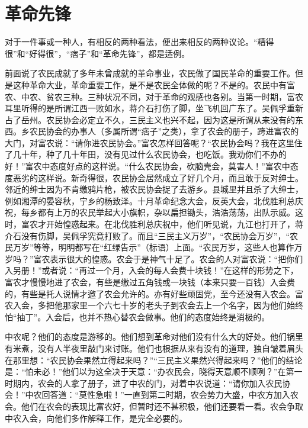 \section{革命先锋}

对于一件事或一种人，有相反的两种看法，便出来相反的两种议论。“糟得很”和“好得很”，“痞子”和“革命先锋”，都是适例。

前面说了农民成就了多年未曾成就的革命事业，农民做了国民革命的重要工作。但是这种革命大业，革命重要工作，是不是农民全体做的呢？不是的。农民中有富农、中农、贫农三种。三种状况不同，对于革命的观感也各别。当第一时期，富农耳里听得的是所谓江西一败如水，蒋介石打伤了脚，坐飞机回广东了。吴佩孚重新占了岳州。农民协会必定立不久，三民主义也兴不起，因为这是所谓从来没有的东西。乡农民协会的办事人（多属所谓“痞子”之类），拿了农会的册子，跨进富农的大门，对富农说：“请你进农民协会。”富农怎样回答呢？“农民协会吗？我在这里住了几十年，种了几十年田，没有见过什么农民协会，也吃饭。我劝你们不办的好！”富农中态度好点的这样说。“什么农民协会，砍脑壳会，莫害人！”富农中态度恶劣的这样说。新奇得很，农民协会居然成立了好几个月，而且敢于反对绅士。邻近的绅士因为不肯缴鸦片枪，被农民协会捉了去游乡。县城里并且杀了大绅士，例如湘潭的晏容秋，宁乡的杨致泽。十月革命纪念大会，反英大会，北伐胜利总庆祝，每乡都有上万的农民举起大小旗帜，杂以扁担锄头，浩浩荡荡，出队示威。这时，富农才开始惶惑起来。在北伐胜利总庆祝中，他们听见说，九江也打开了，蒋介石没有伤脚，吴佩孚究竟打败了。而且“三民主义万岁”，“农民协会万岁”，“农民万岁”等等，明明都写在“红绿告示”（标语）上面。“农民万岁，这些人也算作万岁吗？”富农表示很大的惶惑。农会于是神气十足了。农会的人对富农说：“把你们入另册！”或者说：“再过一个月，入会的每人会费十块钱！”在这样的形势之下，富农才慢慢地进了农会，有些是缴过五角钱或一块钱（本来只要一百钱）入会费的，有些是托人说情才邀了农会允许的。亦有好些顽固党，至今还没有入农会。富农入会，多把他那家里一个六七十岁的老头子到农会去上一个名字，因为他们始终怕“抽丁”。入会后，也并不热心替农会做事。他们的态度始终是消极的。

中农呢？他们的态度是游移的。他们想到革命对他们没有什么大的好处。他们锅里有米煮，没有人半夜里敲门来讨账。他们也根据从来有没有的道理，独自皱着眉头在那里想：“农民协会果然立得起来吗？”“三民主义果然兴得起来吗？”他们的结论是：“怕未必！”他们以为这全决于天意：“办农民会，晓得天意顺不顺咧？”在第一时期内，农会的人拿了册子，进了中农的门，对着中农说道：“请你加入农民协会！”中农回答道：“莫性急啦！”一直到第二时期，农会势力大盛，中农方加入农会。他们在农会的表现比富农好，但暂时还不甚积极，他们还要看一看。农会争取中农入会，向他们多作解释工作，是完全必要的。

